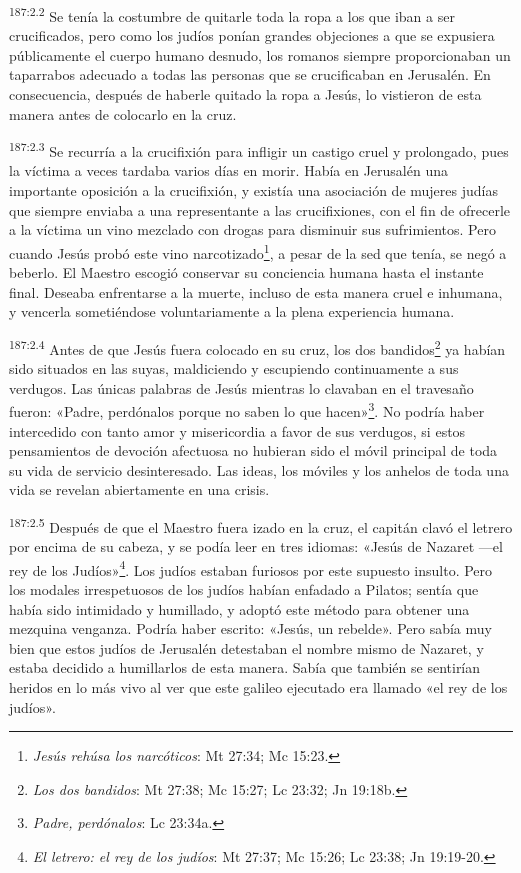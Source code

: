 \par 
\textsuperscript{187:2.2} Se tenía la costumbre de quitarle toda la ropa a los que iban a ser crucificados, pero como los judíos ponían grandes objeciones a que se expusiera públicamente el cuerpo humano desnudo, los romanos siempre proporcionaban un taparrabos adecuado a todas las personas que se crucificaban en Jerusalén. En consecuencia, después de haberle quitado la ropa a Jesús, lo vistieron de esta manera antes de colocarlo en la cruz.

\par 
\textsuperscript{187:2.3} Se recurría a la crucifixión para infligir un castigo cruel y prolongado, pues la víctima a veces tardaba varios días en morir. Había en Jerusalén una importante oposición a la crucifixión, y existía una asociación de mujeres judías que siempre enviaba a una representante a las crucifixiones, con el fin de ofrecerle a la víctima un vino mezclado con drogas para disminuir sus sufrimientos. Pero cuando Jesús probó este vino narcotizado\footnote{\textit{Jesús rehúsa los narcóticos}: Mt 27:34; Mc 15:23.}, a pesar de la sed que tenía, se negó a beberlo. El Maestro escogió conservar su conciencia humana hasta el instante final. Deseaba enfrentarse a la muerte, incluso de esta manera cruel e inhumana, y vencerla sometiéndose voluntariamente a la plena experiencia humana.

\par 
\textsuperscript{187:2.4} Antes de que Jesús fuera colocado en su cruz, los dos bandidos\footnote{\textit{Los dos bandidos}: Mt 27:38; Mc 15:27; Lc 23:32; Jn 19:18b.} ya habían sido situados en las suyas, maldiciendo y escupiendo continuamente a sus verdugos. Las únicas palabras de Jesús mientras lo clavaban en el travesaño fueron: «Padre, perdónalos porque no saben lo que hacen»\footnote{\textit{Padre, perdónalos}: Lc 23:34a.}. No podría haber intercedido con tanto amor y misericordia a favor de sus verdugos, si estos pensamientos de devoción afectuosa no hubieran sido el móvil principal de toda su vida de servicio desinteresado. Las ideas, los móviles y los anhelos de toda una vida se revelan abiertamente en una crisis.

\par 
\textsuperscript{187:2.5} Después de que el Maestro fuera izado en la cruz, el capitán clavó el letrero por encima de su cabeza, y se podía leer en tres idiomas: «Jesús de Nazaret ---el rey de los Judíos»\footnote{\textit{El letrero: el rey de los judíos}: Mt 27:37; Mc 15:26; Lc 23:38; Jn 19:19-20.}. Los judíos estaban furiosos por este supuesto insulto. Pero los modales irrespetuosos de los judíos habían enfadado a Pilatos; sentía que había sido intimidado y humillado, y adoptó este método para obtener una mezquina venganza. Podría haber escrito: «Jesús, un rebelde». Pero sabía muy bien que estos judíos de Jerusalén detestaban el nombre mismo de Nazaret, y estaba decidido a humillarlos de esta manera. Sabía que también se sentirían heridos en lo más vivo al ver que este galileo ejecutado era llamado «el rey de los judíos».

